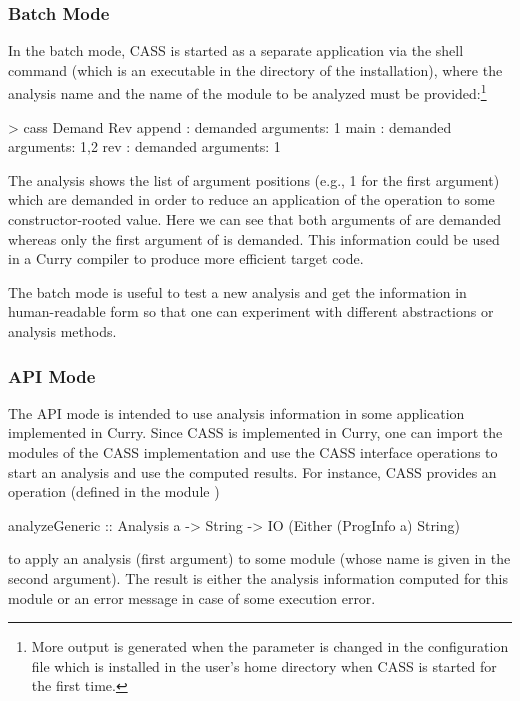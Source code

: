 \subsubsection{Batch Mode}

In the batch mode, CASS is started as a separate application
via the shell command  (which is an executable
in the  directory of the \CYS installation),
where the analysis name and the name of the module to be analyzed
must be provided:\footnote{More output is generated when
the parameter  is changed in the configuration file
 which is installed in the user's home directory
when CASS is started for the first time.}
\begin{curry}
> cass Demand Rev
append : demanded arguments: 1
main : demanded arguments: 1,2
rev : demanded arguments: 1
\end{curry}
The  analysis shows the list of argument positions
(e.g., 1 for the first argument) which are demanded in order
to reduce an application of the operation to some constructor-rooted value.
Here we can see that both arguments of  are demanded
whereas only the first argument of  is demanded.
This information could be used in a Curry compiler
to produce more efficient target code.

The batch mode is useful to test a new analysis and get the information
in human-readable form so that one can experiment
with different abstractions or analysis methods.

\subsubsection{API Mode}

The API mode is intended to use analysis information in some
application implemented in Curry. Since CASS is implemented in Curry,
one can import the modules of the CASS implementation and
use the CASS interface operations to start an analysis and use the
computed results. For instance, CASS provides an operation
(defined in the module )
\begin{curry}
analyzeGeneric :: Analysis a -> String -> IO (Either (ProgInfo a) String)
\end{curry}
to apply an analysis (first argument) to some module (whose name is
given in the second argument). The result is either the analysis
information computed for this module or an error message in case of
some execution error.

